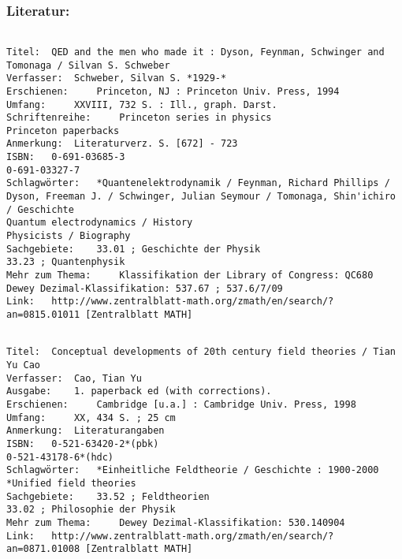\documentclass[twoside,a4paper]{scrartcl}
\renewcommand{\1}{\mathds{1}}
\begin{document}
\subsubsection*{Literatur:}
\begin{tiny}
\begin{verbatim}

Titel: 	QED and the men who made it : Dyson, Feynman, Schwinger and Tomonaga / Silvan S. Schweber
Verfasser: 	Schweber, Silvan S. *1929-*
Erschienen: 	Princeton, NJ : Princeton Univ. Press, 1994
Umfang: 	XXVIII, 732 S. : Ill., graph. Darst.
Schriftenreihe: 	Princeton series in physics
Princeton paperbacks
Anmerkung: 	Literaturverz. S. [672] - 723
ISBN: 	0-691-03685-3
0-691-03327-7
Schlagwörter: 	*Quantenelektrodynamik / Feynman, Richard Phillips / Dyson, Freeman J. / Schwinger, Julian Seymour / Tomonaga, Shin'ichiro / Geschichte
Quantum electrodynamics / History
Physicists / Biography
Sachgebiete: 	33.01 ; Geschichte der Physik
33.23 ; Quantenphysik
Mehr zum Thema: 	Klassifikation der Library of Congress: QC680
Dewey Dezimal-Klassifikation: 537.67 ; 537.6/7/09
Link: 	http://www.zentralblatt-math.org/zmath/en/search/?an=0815.01011 [Zentralblatt MATH]
\end{verbatim}
\end{tiny}


\begin{tiny}
\begin{verbatim}

Titel: 	Conceptual developments of 20th century field theories / Tian Yu Cao
Verfasser: 	Cao, Tian Yu
Ausgabe: 	1. paperback ed (with corrections).
Erschienen: 	Cambridge [u.a.] : Cambridge Univ. Press, 1998
Umfang: 	XX, 434 S. ; 25 cm
Anmerkung: 	Literaturangaben
ISBN: 	0-521-63420-2*(pbk)
0-521-43178-6*(hdc)
Schlagwörter: 	*Einheitliche Feldtheorie / Geschichte : 1900-2000
*Unified field theories
Sachgebiete: 	33.52 ; Feldtheorien
33.02 ; Philosophie der Physik
Mehr zum Thema: 	Dewey Dezimal-Klassifikation: 530.140904
Link: 	http://www.zentralblatt-math.org/zmath/en/search/?an=0871.01008 [Zentralblatt MATH]
\end{verbatim}
\end{tiny}
\end{document}
